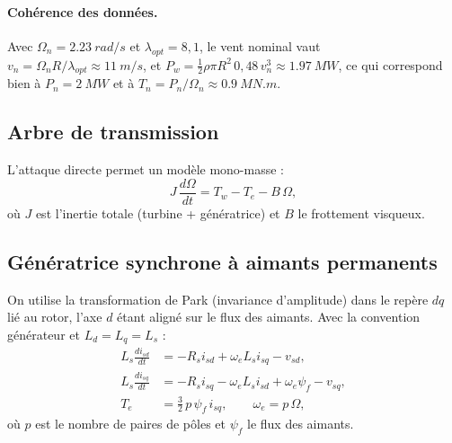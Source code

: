 \documentclass[11pt,a4paper]{article}
\theoremstyle{remark}
\begin{document}
\paragraph{Cohérence des données.} Avec $\Omega_n=\SI{2,23}{rad/s}$ et $\lambda_{opt}=8{,}1$, le vent
nominal vaut $v_n=\Omega_n R/\lambda_{opt}\approx\SI{11}{m/s}$, et
$P_w=\tfrac12\rho\pi R^2\,0{,}48\,v_n^3\approx\SI{1,97}{MW}$, ce qui correspond bien à
$P_n=\SI{2}{MW}$ et à $T_n=P_n/\Omega_n\approx\SI{0,9}{MN.m}$.

\subsection{Arbre de transmission}
L'attaque directe permet un modèle mono-masse :
\begin{equation}
  J\,\frac{d\Omega}{dt} = T_w - T_e - B\,\Omega ,
  \label{eq:arbre}
\end{equation}
où $J$ est l'inertie totale (turbine + génératrice) et $B$ le frottement visqueux.

\subsection{Génératrice synchrone à aimants permanents}
On utilise la transformation de Park (invariance d'amplitude) dans le repère $dq$ lié au rotor,
l'axe $d$ étant aligné sur le flux des aimants. Avec la convention générateur et $L_d=L_q=L_s$ :
\begin{align}
  L_s\frac{di_{sd}}{dt} &= -R_s i_{sd} + \omega_e L_s i_{sq} - v_{sd}, \label{eq:pmsg_d}\\
  L_s\frac{di_{sq}}{dt} &= -R_s i_{sq} - \omega_e L_s i_{sd} + \omega_e\psi_f - v_{sq}, \label{eq:pmsg_q}\\
  T_e &= \tfrac32\,p\,\psi_f\, i_{sq}, \qquad \omega_e = p\,\Omega, \label{eq:couple}
\end{align}
où $p$ est le nombre de paires de pôles et $\psi_f$ le flux des aimants.
\end{document}
